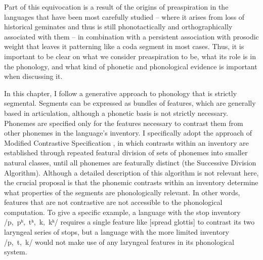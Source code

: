 \documentclass[output=paper,colorlinks,citecolor=brown]{langscibook}
\begin{document}
Part of this equivocation is a result of the origins of preaspiration in the languages that have been most carefully studied -- where it arises from loss of historical geminates and thus is still phonotactically and orthographically associated with them --  in combination with a persistent association with prosodic weight that leaves it patterning like a coda segment in most cases. Thus, it is important to be clear on what we consider preaspiration to be, what its role is in the phonology, and what kind of phonetic and phonological evidence is important when discussing it.

In this chapter, I follow a generative approach to phonology that is strictly segmental. Segments can be expressed as bundles of features, which are generally based in articulation, although a phonetic basis is not strictly necessary. Phonemes are specified only for the features necessary to contrast them from other phonemes in the language's inventory. I specifically adopt the approach of Modified Contrastive Specification \citep{dresher2009,hall2011}, in which contrasts within an inventory are established through repeated featural division of sets of phonemes into smaller natural classes, until all phonemes are featurally distinct (the Successive Division Algorithm). Although a detailed description of this algorithm is not relevant here, the crucial proposal is that the phonemic contrasts within an inventory determine what properties of the segments are phonologically relevant. In other words, features that are not contrastive are not accessible to the phonological computation. To give a specific example, a language with the stop inventory /p,~pʰ,~tʰ,~k,~kʰ/ requires a single feature like [spread glottis] to contrast its two laryngeal series of stops, but a language with the more limited inventory /p,~t,~k/ would not make use of any laryngeal features in its phonological system.
\end{document}
